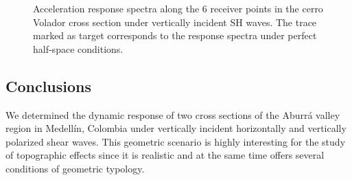 \documentclass[11pt,letterpaper]{article}
\begin{document}
\begin{figure}[H]
	\center
	\caption{\small Acceleration response spectra along the 6 receiver points in the cerro Volador cross section under vertically incident SH waves. The trace marked as target corresponds to the response spectra under perfect half-space conditions.}
 \label{fig:SaptosVolEWSH_fisica}
\end{figure}






\subsection*{Conclusions}
We determined the dynamic response of two cross sections of the Aburrá valley region in Medellín, Colombia under vertically incident horizontally and vertically polarized shear waves. This geometric scenario is highly interesting for the study of topographic effects since it is realistic and at the same time offers several conditions of geometric typology.
\end{document}
